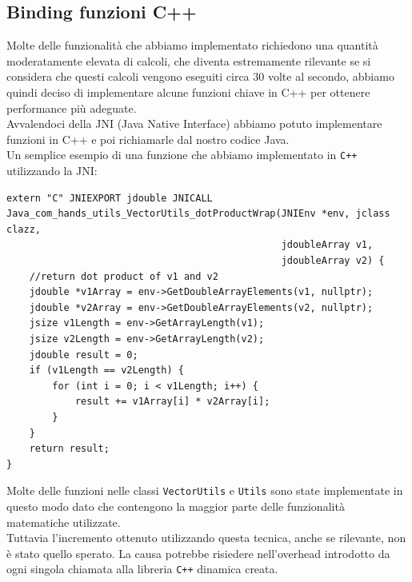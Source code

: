 \newpage
\subsection{Binding funzioni C++}
\label{chap:cpp}
\noindent
Molte delle funzionalità che abbiamo implementato richiedono una quantità moderatamente elevata di calcoli, che diventa estremamente rilevante se si considera che questi calcoli vengono eseguiti circa 30 volte al secondo, abbiamo quindi deciso di implementare alcune funzioni chiave in C++ per ottenere performance più adeguate.\\

\noindent
Avvalendoci della JNI (Java Native Interface) abbiamo potuto implementare funzioni in C++ e poi richiamarle dal nostro codice Java.\\

\noindent
Un semplice esempio di una funzione che abbiamo implementato in \texttt{C++} utilizzando la JNI:
\begin{verbatim}
extern "C" JNIEXPORT jdouble JNICALL
Java_com_hands_utils_VectorUtils_dotProductWrap(JNIEnv *env, jclass clazz,
                                                jdoubleArray v1,
                                                jdoubleArray v2) {
    //return dot product of v1 and v2
    jdouble *v1Array = env->GetDoubleArrayElements(v1, nullptr);
    jdouble *v2Array = env->GetDoubleArrayElements(v2, nullptr);
    jsize v1Length = env->GetArrayLength(v1);
    jsize v2Length = env->GetArrayLength(v2);
    jdouble result = 0;
    if (v1Length == v2Length) {
        for (int i = 0; i < v1Length; i++) {
            result += v1Array[i] * v2Array[i];
        }
    }
    return result;
}
\end{verbatim}

\noindent Molte delle funzioni nelle classi \texttt{VectorUtils} e \texttt{Utils} sono state implementate in questo modo dato che contengono la maggior parte delle funzionalità matematiche utilizzate.\\
Tuttavia l'incremento ottenuto utilizzando questa tecnica, anche se rilevante, non è stato quello sperato. La causa potrebbe risiedere nell'overhead introdotto da ogni singola chiamata alla libreria \texttt{C++} dinamica creata.

